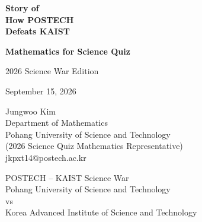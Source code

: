 \documentclass[11pt,oneside]{book}
\newcommand{\institutiontext}[2]{%
    \texorpdfstring{\textcolor{#1}{#2}}{#2}%
}
\DeclareRobustCommand{\POSTECH}{\institutiontext{POSTECHRed}{POSTECH}}
\DeclareRobustCommand{\PohangUniversityOfScienceAndTechnology}{%
    \institutiontext{POSTECHRed}{Pohang University of Science and Technology}%
}
\DeclareRobustCommand{\KAIST}{\institutiontext{KAISTBlue}{KAIST}}
\DeclareRobustCommand{\KoreaAdvancedInstituteOfScienceAndTechnology}{%
    \institutiontext{KAISTBlue}{Korea Advanced Institute of Science and Technology}%
}
\theoremstyle{sciencequizdefinition}
\theoremstyle{sciencequizplain}
\theoremstyle{sciencequizdefinition}
\theoremstyle{sciencequizsameline}
\begin{document}

    \begin{titlepage}
        \centering

        \vspace*{2.4cm}

        {\Huge\bfseries Story of\\[0.35em]
        How \POSTECH\\[0.35em]
        Defeats \KAIST\par}

        \vspace{0.7cm}

        {\LARGE\bfseries Mathematics for Science Quiz\par}

        \vspace{0.55cm}

        {\large 2026 Science War Edition\par}
        {\normalsize September 15, 2026\par}

        \vspace{1.15cm}

        {\large
        Jungwoo Kim\\
        Department of Mathematics\\
        \PohangUniversityOfScienceAndTechnology\\
        (2026 Science Quiz Mathematics Representative)\\
        jkpxt14@postech.ac.kr
        \par}

        \vfill

        {\large
        \POSTECH--\KAIST{} Science War\\[0.7em]
        \PohangUniversityOfScienceAndTechnology\\
        vs\\
        \KoreaAdvancedInstituteOfScienceAndTechnology
        \par}

        \vspace{0.3cm}

    \end{titlepage}


    

    

    \tableofcontents
\end{document}
